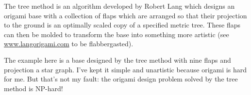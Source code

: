 



\thispagestyle{empty}

The tree method is an algorithm developed by Robert Lang which designs
an origami base with a collection of flaps which are arranged so that
their projection to the ground is an optimally scaled copy of a
specified metric tree. These flaps can then be molded to transform the
base into something more artistic (see \url{www.langorigami.com} to be flabbergasted).

The example here is a base designed by the tree method with nine flaps
and projection a star graph. I've kept it simple and unartistic
because origami is hard for me. But that's not my fault: the origami
design problem solved by the tree method is NP-hard!



